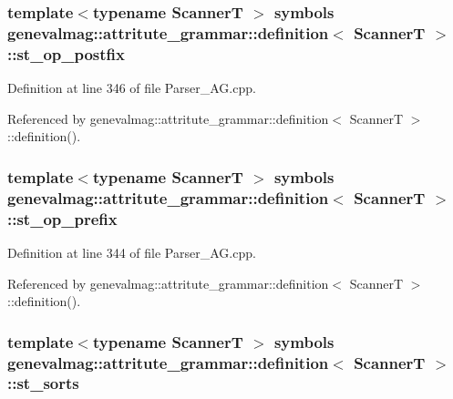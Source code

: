 \hypertarget{structgenevalmag_1_1attritute__grammar_1_1definition_a628bd190709469b07c2f64c1763fffdf}{
\subsubsection[{st\_\-op\_\-postfix}]{\setlength{\rightskip}{0pt plus 5cm}template$<$typename ScannerT $>$ symbols {\bf genevalmag::attritute\_\-grammar::definition}$<$ ScannerT $>$::{\bf st\_\-op\_\-postfix}}}
\label{structgenevalmag_1_1attritute__grammar_1_1definition_a628bd190709469b07c2f64c1763fffdf}


Definition at line 346 of file Parser\_\-AG.cpp.



Referenced by genevalmag::attritute\_\-grammar::definition$<$ ScannerT $>$::definition().

\hypertarget{structgenevalmag_1_1attritute__grammar_1_1definition_aeb3e8d6c6539eb627c38f96a5ae72759}{
\subsubsection[{st\_\-op\_\-prefix}]{\setlength{\rightskip}{0pt plus 5cm}template$<$typename ScannerT $>$ symbols {\bf genevalmag::attritute\_\-grammar::definition}$<$ ScannerT $>$::{\bf st\_\-op\_\-prefix}}}
\label{structgenevalmag_1_1attritute__grammar_1_1definition_aeb3e8d6c6539eb627c38f96a5ae72759}


Definition at line 344 of file Parser\_\-AG.cpp.



Referenced by genevalmag::attritute\_\-grammar::definition$<$ ScannerT $>$::definition().

\hypertarget{structgenevalmag_1_1attritute__grammar_1_1definition_a22d68c8aa8d0c27b6272da7e076dc338}{
\subsubsection[{st\_\-sorts}]{\setlength{\rightskip}{0pt plus 5cm}template$<$typename ScannerT $>$ symbols {\bf genevalmag::attritute\_\-grammar::definition}$<$ ScannerT $>$::{\bf st\_\-sorts}}}
\label{structgenevalmag_1_1attritute__grammar_1_1definition_a22d68c8aa8d0c27b6272da7e076dc338}


